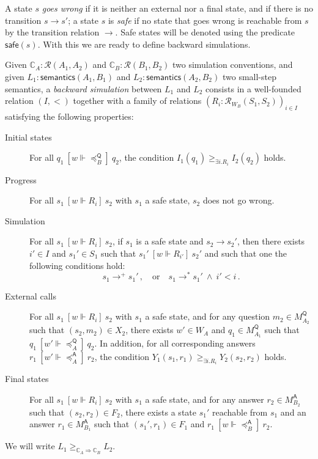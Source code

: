 \documentclass[acmsmall,timestamp,review,anonymous]{acmart}
\newcommand{\kw}[1]{\ensuremath{ \mathsf{#1} }}
\newcommand{\ifr}[1]{\ [{#1}]\ }
\begin{document}
A state $s$ \emph{goes wrong}
if it is neither an external nor a final state,
and if there is no transition $s \rightarrow s'$;
a state $s$ is \emph{safe}
if no state that goes wrong is reachable from $s$
by the transition relation $\rightarrow$.
Safe states will be denoted using the predicate $\kw{safe}(s)$.
With this we are ready to define backward simulations.

\begin{definition}
Given
$\mathbb{C}_A : \mathcal{R}(A_1, A_2)$ and
$\mathbb{C}_B : \mathcal{R}(B_1, B_2)$
two simulation conventions,
and given
$L_1 : \kw{semantics}(A_1, B_1)$ and
$L_2 : \kw{semantics}(A_2, B_2)$
two small-step semantics,
a \emph{backward simulation} between $L_1$ and $L_2$
consists in a
well-founded relation $(I, <)$
together with a family of relations
$(R_i : \mathcal{R}_{W_B}(S_1, S_2))_{i \in I}$
satisfying the following properties:
\begin{description}
\item[Initial states]
  For all
  $q_1 \ifr{w \Vdash {\preceq}_B^\kw{Q}} q_2$,
  the condition $I_1(q_1) \ge_{\exists i . R_i} I_2(q_2)$ holds.
\item[Progress]
  For all $s_1 \ifr{w \Vdash R_i} s_2$
  with $s_1$ a safe state,
  $s_2$ does not go wrong.
\item[Simulation]
  For all $s_1 \ifr{w \Vdash R_i} s_2$,
  if $s_1$ is a safe state and $s_2 \rightarrow s_2'$,
  then there exists $i' \in I$ and $s_1' \in S_1$
  such that $s_1' \ifr{w \Vdash R_{i'}} s_2'$ and
  such that one the following conditions hold:
  \[
    s_1 \rightarrow^+ s_1' \,, \quad \mbox{or} \quad
    s_1 \rightarrow^* s_1' \:\wedge\: i' < i \,.
  \]
\item[External calls]
  For all $s_1 \ifr{w \Vdash R_i} s_2$
  with $s_1$ a safe state, and
  for any question $m_2 \in M_{A_2}^\kw{Q}$
  such that $(s_2, m_2) \in X_2$,
  there exists $w' \in W_A$ and $q_1 \in M_{A_1}^\kw{Q}$
  such that $q_1 \ifr{w' \Vdash {\preceq}_A^\kw{Q}} q_2$.
  In addition, for all corresponding answers
  $r_1 \ifr{w' \Vdash {\preceq}_A^\kw{A}} r_2$,
  the condition $Y_1(s_1, r_1) \ge_{\exists i . R_i} Y_2(s_2, r_2)$ holds.
\item[Final states]
  For all $s_1 \ifr{w \Vdash R_i} s_2$
  with $s_1$ a safe state, and
  for any answer $r_2 \in M_{B_2}^\kw{A}$
  such that $(s_2, r_2) \in F_2$,
  there exists a state $s_1'$ reachable from $s_1$ and
  an answer $r_1 \in M_{B_1}^\kw{A}$ such that
  $(s_1', r_1) \in F_1$ and $r_1 \ifr{w \Vdash {\preceq}_B^\kw{A}} r_2$.
\end{description}
We will write $L_1 \ge_{\mathbb{C}_A \Rightarrow \mathbb{C}_B} L_2$.
\end{definition}
\end{document}
